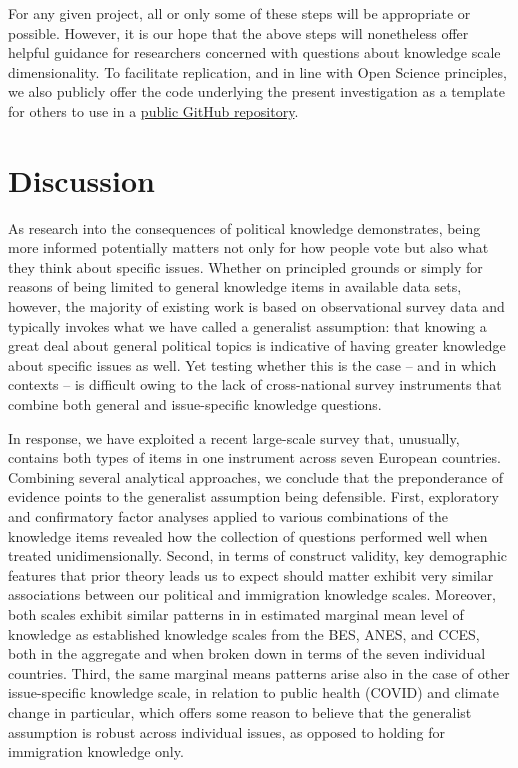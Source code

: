 \documentclass[11pt,halfline,a4paper,]{ouparticle}
\begin{document}
For any given project, all or only some of these steps will be
appropriate or possible. However, it is our hope that the above steps
will nonetheless offer helpful guidance for researchers concerned with
questions about knowledge scale dimensionality. To facilitate
replication, and in line with Open Science principles, we also publicly
offer the code underlying the present investigation as a template for
others to use in a
\href{https://github.com/ahlstromvij/REMINDER_project}{public GitHub
repository}.

\hypertarget{discussion}{%
\section{Discussion}\label{discussion}}

As research into the consequences of political knowledge demonstrates,
being more informed potentially matters not only for how people vote but
also what they think about specific issues. Whether on principled
grounds or simply for reasons of being limited to general knowledge
items in available data sets, however, the majority of existing work is
based on observational survey data and typically invokes what we have
called a generalist assumption: that knowing a great deal about general
political topics is indicative of having greater knowledge about
specific issues as well. Yet testing whether this is the case -- and in
which contexts -- is difficult owing to the lack of cross-national
survey instruments that combine both general and issue-specific
knowledge questions.

In response, we have exploited a recent large-scale survey that,
unusually, contains both types of items in one instrument across seven
European countries. Combining several analytical approaches, we conclude
that the preponderance of evidence points to the generalist assumption
being defensible. First, exploratory and confirmatory factor analyses
applied to various combinations of the knowledge items revealed how the
collection of questions performed well when treated unidimensionally.
Second, in terms of construct validity, key demographic features that
prior theory leads us to expect should matter exhibit very similar
associations between our political and immigration knowledge scales.
Moreover, both scales exhibit similar patterns in in estimated marginal
mean level of knowledge as established knowledge scales from the BES,
ANES, and CCES, both in the aggregate and when broken down in terms of
the seven individual countries. Third, the same marginal means patterns
arise also in the case of other issue-specific knowledge scale, in
relation to public health (COVID) and climate change in particular,
which offers some reason to believe that the generalist assumption is
robust across individual issues, as opposed to holding for immigration
knowledge only.
\end{document}

